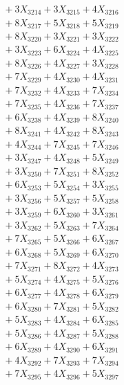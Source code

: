 \documentclass[a4paper,10pt]{article}
\begin{document}
{\begin{align}
&\;  + 3 X_{3214} + 3 X_{3215} + 4 X_{3216} \\[0.3ex]
&\;  + 8 X_{3217} + 5 X_{3218} + 5 X_{3219} \\[0.5ex]\allowbreak
&\;  + 8 X_{3220} + 3 X_{3221} + 3 X_{3222} \\[0.3ex]
&\;  + 3 X_{3223} + 6 X_{3224} + 4 X_{3225} \\[0.3ex]
&\;  + 8 X_{3226} + 4 X_{3227} + 3 X_{3228} \\[0.3ex]
&\;  + 7 X_{3229} + 4 X_{3230} + 4 X_{3231} \\[0.3ex]
&\;  + 7 X_{3232} + 4 X_{3233} + 7 X_{3234} \\[0.3ex]
&\;  + 7 X_{3235} + 4 X_{3236} + 7 X_{3237} \\[0.3ex]
&\;  + 6 X_{3238} + 4 X_{3239} + 8 X_{3240} \\[0.3ex]
&\;  + 8 X_{3241} + 4 X_{3242} + 8 X_{3243} \\[0.3ex]
&\;  + 4 X_{3244} + 7 X_{3245} + 7 X_{3246} \\[0.3ex]
&\;  + 3 X_{3247} + 4 X_{3248} + 5 X_{3249} \\[0.5ex]\allowbreak
&\;  + 3 X_{3250} + 7 X_{3251} + 8 X_{3252} \\[0.3ex]
&\;  + 6 X_{3253} + 5 X_{3254} + 3 X_{3255} \\[0.3ex]
&\;  + 3 X_{3256} + 5 X_{3257} + 5 X_{3258} \\[0.3ex]
&\;  + 3 X_{3259} + 6 X_{3260} + 3 X_{3261} \\[0.3ex]
&\;  + 3 X_{3262} + 5 X_{3263} + 7 X_{3264} \\[0.3ex]
&\;  + 7 X_{3265} + 5 X_{3266} + 6 X_{3267} \\[0.3ex]
&\;  + 6 X_{3268} + 5 X_{3269} + 6 X_{3270} \\[0.3ex]
&\;  + 7 X_{3271} + 8 X_{3272} + 4 X_{3273} \\[0.3ex]
&\;  + 5 X_{3274} + 4 X_{3275} + 5 X_{3276} \\[0.3ex]
&\;  + 6 X_{3277} + 4 X_{3278} + 6 X_{3279} \\[0.5ex]\allowbreak
&\;  + 6 X_{3280} + 7 X_{3281} + 5 X_{3282} \\[0.3ex]
&\;  + 5 X_{3283} + 4 X_{3284} + 6 X_{3285} \\[0.3ex]
&\;  + 5 X_{3286} + 4 X_{3287} + 5 X_{3288} \\[0.3ex]
&\;  + 6 X_{3289} + 4 X_{3290} + 6 X_{3291} \\[0.3ex]
&\;  + 4 X_{3292} + 7 X_{3293} + 7 X_{3294} \\[0.3ex]
&\;  + 7 X_{3295} + 4 X_{3296} + 5 X_{3297} \\[0.3ex]

\end{align}}
\end{document}
